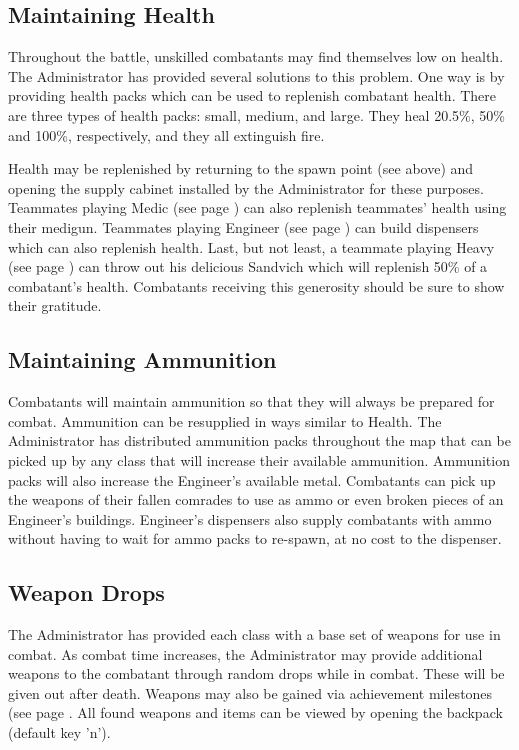 \subsection{Maintaining Health}
\label{Maintaining_Health}
Throughout the battle, unskilled combatants may find themselves low on health. The Administrator has provided several solutions to this problem. One way is by providing health packs which can be used to replenish combatant health. There are three types of health packs: small, medium, and large. They heal 20.5\%, 50\% and 100\%, respectively, and they all extinguish fire.

Health may be replenished by returning to the spawn point (see above) and opening the supply cabinet installed by the Administrator for these purposes. Teammates playing Medic (see page \pageref{Medic}) can also replenish teammates' health using their medigun. Teammates playing Engineer (see page \pageref{Engineer}) can build dispensers which can also replenish health. Last, but not least, a teammate playing Heavy (see page \pageref{Heavy}) can throw out his delicious Sandvich which will replenish 50\% of a combatant's health. Combatants receiving this generosity should be sure to show their gratitude.

\subsection{Maintaining Ammunition}
\label{Maintaining_Ammunition}
Combatants will maintain ammunition so that they will always be prepared for combat.  Ammunition can be resupplied in ways similar to Health.  The Administrator has distributed ammunition packs throughout the map that can be picked up by any class that will increase their available ammunition.  Ammunition packs will also increase the Engineer's available metal. Combatants can pick up the weapons of their fallen comrades to use as ammo or even broken pieces of an Engineer's buildings.  Engineer's dispensers also supply combatants with ammo without having to wait for ammo packs to re-spawn, at no cost to the dispenser.

\subsection{Weapon Drops}
The Administrator has provided each class with a base set of weapons for use in combat.  As combat time increases, the Administrator may provide additional weapons to the combatant through random drops while in combat. These will be given out after death.  Weapons may also be gained via achievement milestones (see page \pageref{Achievements}. All found weapons and items can be viewed by opening the backpack (default key 'n'). 

